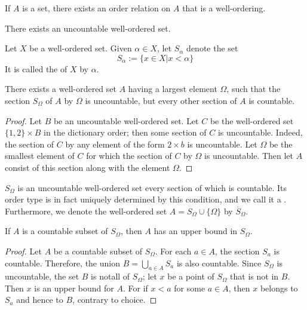 \documentclass[12pt, a4paper, oneside, openright, titlepage]{book}
\begin{document}
\begin{appendices}
    \begin{theorem}
        If $A$ is a set, there exists an order relation on $A$ that is a well-ordering.
    \end{theorem}


    \begin{corollary}
        There exists an uncountable well-ordered set.
    \end{corollary}


    \begin{definition}
        Let $X$ be a well-ordered set. Given $\alpha \in X$, let $S_{\alpha}$ denote the set \begin{equation*}
            S_{\alpha} := \{x \in X\vert x < \alpha\}
        \end{equation*}
        It is called the  of $X$ by $\alpha$.
    \end{definition}


    \begin{lemma}
        There exists a well-ordered set $A$ having a largest element $\Omega$, such that the section $S_{\Omega}$ of $A$ by $\Omega$ is uncountable, but every other section of $A$ is countable.
    \end{lemma}
    \begin{proof}
        Let $B$ be an uncountable well-ordered set. Let $C$ be the well-ordered set $\{1,2\}\times B$ in the dictionary order; then some section of $C$ is uncountable. Indeed, the section of $C$ by any element of the form $2\times b$ is uncountable. Let $\Omega$ be the smallest element of $C$ for which the section of $C$ by $\Omega$ is uncountable. Then let $A$ consist of this section along with the element $\Omega$.
    \end{proof}

    \begin{remark}
        $S_{\Omega}$ is an uncountable well-ordered set every section of which is countable. Its order type is in fact uniquely determined by this condition, and we call it a . Furthermore, we denote the well-ordered set $A = S_{\Omega}\cup\{\Omega\}$ by $\overline{S}_{\Omega}$.
    \end{remark}

    \begin{theorem}
        If $A$ is a countable subset of $S_{\Omega}$, then $A$ has an upper bound in $S_{\Omega}$.
    \end{theorem}
    \begin{proof}
        Let $A$ be a countable subset of $S_{\Omega}$. For each $a \in A$, the section $S_a$ is countable. Therefore, the union $B = \bigcup_{a\in A}S_a$ is also countable. Since $S_{\Omega}$ is uncountable, the set $B$ is notall of $S_{\Omega}$; let $x$ be a point of $S_{\Omega}$ that is not in $B$. Then $x$ is an upper bound for $A$. For if $x < a$ for some $a \in A$, then $x$ belongs to $S_a$ and hence to $B$, contrary to choice.
    \end{proof}



\end{appendices}
\end{document}

